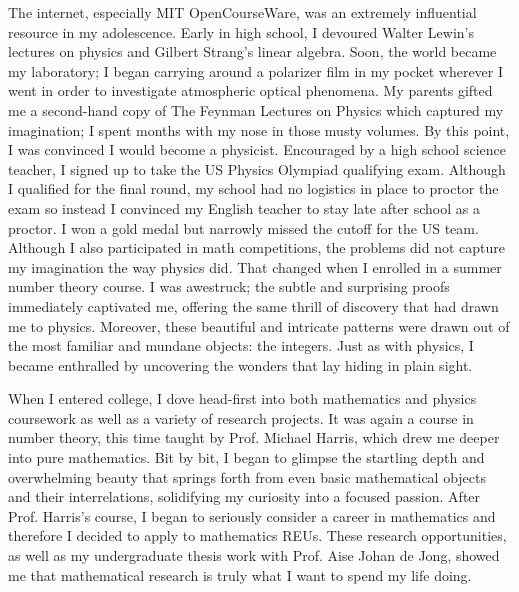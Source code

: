 \documentclass[11pt]{article}
\begin{document}
The internet, especially MIT OpenCourseWare, was an extremely influential resource in my adolescence. Early in high school, I devoured Walter Lewin’s lectures on physics and Gilbert Strang's linear algebra. Soon, the world became my laboratory; I began carrying around a polarizer film in my pocket wherever I went in order to investigate atmospheric optical phenomena. My parents gifted me a second-hand copy of The Feynman Lectures on Physics which captured my imagination; I spent months with my nose in those musty volumes. By this point, I was convinced I would become a physicist. Encouraged by a high school science teacher, I signed up to take the US Physics Olympiad qualifying exam. Although I qualified for the final round, my school had no logistics in place to proctor the exam so instead I convinced my English teacher to stay late after school as a proctor. I won a gold medal but narrowly missed the cutoff for the US team. Although I also participated in math competitions, the problems did not capture my imagination the way physics did. That changed when I enrolled in a summer number theory course. I was awestruck; the subtle and surprising proofs immediately captivated me, offering the same thrill of discovery that had drawn me to physics. Moreover, these beautiful and intricate patterns were drawn out of the most familiar and mundane objects: the integers. Just as with physics, I became enthralled by uncovering the wonders that lay hiding in plain sight.
\par
When I entered college, I dove head-first into both mathematics and physics coursework as well as a variety of research projects. It was again a course in number theory, this time taught by Prof. Michael Harris, which drew me deeper into pure mathematics. Bit by bit, I began to glimpse the startling depth and overwhelming beauty that springs forth from even basic mathematical objects and their interrelations, solidifying my curiosity into a focused passion. After Prof. Harris’s course, I began to seriously consider a career in mathematics and therefore I decided to apply to mathematics REUs. These research opportunities, as well as my undergraduate thesis work with Prof. Aise Johan de Jong, showed me that mathematical research is truly what I want to spend my life doing. 
\par
\end{document}
